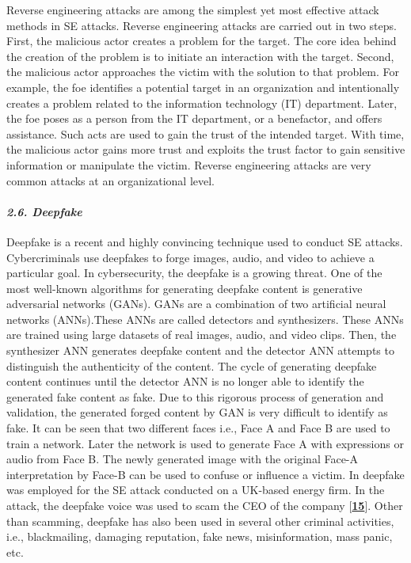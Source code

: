 Reverse engineering attacks are among the simplest yet most effective attack methods in SE attacks. Reverse engineering attacks are carried out in two steps. First, the malicious actor creates a problem for the target. The core idea behind the creation of the problem is to initiate an interaction with the target. Second, the malicious actor approaches the victim with the solution to that problem. For example, the foe identifies a potential target in an organization and intentionally creates a problem related to the information technology (IT) department. Later, the foe poses as a person from the IT department, or a benefactor, and offers assistance. Such acts are used to gain the trust of the intended target. With time, the malicious actor gains more trust and exploits the trust factor to gain sensitive information or manipulate the victim. Reverse engineering attacks are very common attacks at an organizational level.

\paragraph{\textit{2.6. Deepfake}}

Deepfake is a recent and highly convincing technique used to conduct SE attacks. Cybercriminals use deepfakes to forge images, audio, and video to achieve a particular goal. In cybersecurity, the deepfake is a growing threat. One of the most well-known algorithms for generating deepfake content is generative adversarial networks (GANs). GANs are a combination of two artificial neural networks (ANNs).These ANNs are called detectors and synthesizers. These ANNs are trained using large datasets of real images, audio, and video clips. Then, the synthesizer ANN generates deepfake content and the detector ANN attempts to distinguish the authenticity of the content. The cycle of generating deepfake content continues until the detector ANN is no longer able to identify the generated fake content as fake. Due to this rigorous process of generation and validation, the generated forged content by GAN is very difficult to identify as fake.  It can be seen that two different faces i.e., Face A and Face B are used to train a network. Later the network is used to generate Face A with expressions or audio from Face B. The newly generated image with the original Face-A interpretation by Face-B can be used to confuse or influence a victim. In  deepfake was employed for the SE attack conducted on a UK-based energy firm. In the attack, the deepfake voice was used to scam the CEO of the company [\href{https://www.mdpi.com/2076-3417/12/12/6042\#B15-applsci-12-06042}{\textbf{15}}]. Other than scamming, deepfake has also been used in several other criminal activities, i.e., blackmailing, damaging reputation, fake news, misinformation, mass panic, etc.


